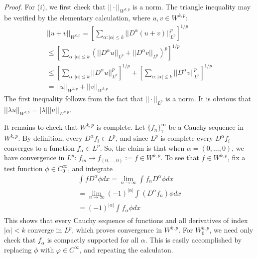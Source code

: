 \documentclass[letterpaper,10pt]{article}
\newcommand{\wkp}{W^{k,p}}
\theoremstyle{definition}
\theoremstyle{remark}
\theoremstyle{plain}
\newenvironment{proofm}{
    \vspace{5pt}
    \begin{mdframed}[
        bottomline=false,topline=false,rightline=false, linecolor=red,linewidth=2pt, skipabove=0
    ]
    \noindent\textit{Proof.}
}{
    \hspace{\fill}\qedsymbol\end{mdframed}
}
\begin{document}
\begin{proofm} %
    For ($i$), we first check that $||\cdot||_{\wkp}$ is a norm.
    The triangle inequality may be verified by the elementary calculation, where $u,v\in\wkp$:
    \begin{align*}
        ||u+v||_{\wkp}=\left[\sum_{\alpha:|\alpha|\leq k}^{}||D^\alpha(u+v)||_{L^p}^p\right]^{1/p}\\
        \leq\left[\sum_{\alpha:|\alpha|\leq k}^{}(||D^\alpha u||_{L^p}+||D^\alpha v||_{L^p})^p\right]^{1/p}\\
        \leq\left[\sum_{\alpha:|\alpha|\leq k}^{}||D^\alpha u||_{L^p}^p\right]^{1/p}
        +\left[\sum_{\alpha:|\alpha|\leq k}^{}||D^\alpha v||_{L^p}^p\right]^{1/p}
        \\
        =||u||_{\wkp}+||v||_{\wkp}
    \end{align*}
    The first inequality follows from the fact that $||\cdot||_{L^p}$ is a norm.
    It is obvious that $||\lambda u||_{\wkp}=|\lambda|||u||_{\wkp}$.

    It remains to check that $\wkp$ is complete. Let $\{f_n\}_1^\infty$ be a Cauchy
    sequence in $\wkp$.
    By definition, every $D^\alpha f_i\in L^p$, and since $L^p$ is complete 
    every $D^\alpha f_i$ converges to a function $f_\alpha\in L^p$.
    So, the claim is that when $\alpha=(0,\ldots,0)$, we have convergence in $L^p$:
    $f_m\rightarrow f_{(0,\ldots,0)}:=f\in\wkp$.
    To see that $f\in\wkp$, fix a test function $\phi\in C^\infty_0$, and integrate
    \begin{align*}
        \int_{}^{}fD^\alpha\phi dx=\lim_{n\rightarrow\infty}\int_{}^{}f_nD^\alpha\phi dx\\
        =\lim_{n\rightarrow\infty}(-1)^{|\alpha|}\int_{}^{}(D^\alpha f_n)\phi dx
        \\
        =(-1)^{|\alpha|}\int_{}^{}f_\alpha \phi dx
    \end{align*}
    This shows that every Cauchy sequence of functions and all derivatives of index 
    $|\alpha|<k$ converge in $L^p$, which proves convergence in $W^{k,p}$.
    For $\wkp_0$, we need only check that $f_\alpha$ is compactly supported for all
    $\alpha$. This is easily accomplished by replacing $\phi$ with $\varphi\in C^\infty$,
    and repeating the calculaton.


\end{proofm}
\end{document}
